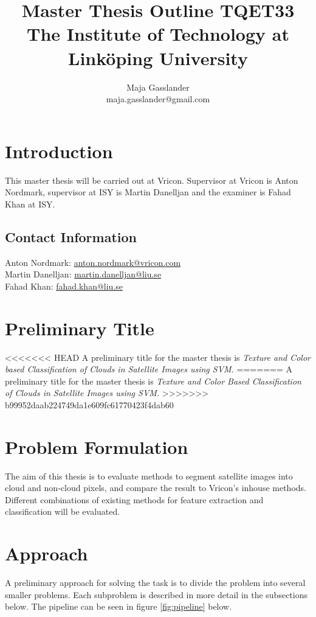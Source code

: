 \documentclass{article}
\title{Master Thesis Outline TQET33 \\
\normalsize{The Institute of Technology at Linköping University}}
\author{Maja Gasslander \\ \normalsize{maja.gasslander@gmail.com}}
\begin{document}
\maketitle
\newpage
\section{Introduction}
This master thesis will be carried out at Vricon. Supervisor at Vricon is Anton Nordmark, supervisor at ISY is Martin Danelljan and the examiner is Fahad Khan at ISY. 

\subsection{Contact Information}
Anton Nordmark: \href{mailto:anton.nordmark@vricon.com}{anton.nordmark@vricon.com}\\
Martin Danelljan: \href{mailto:martin.danelljan@liu.se}{martin.danelljan@liu.se} \\
Fahad Khan: \href{mailto:fahad.khan@liu.se}{fahad.khan@liu.se}


\section{Preliminary Title}
<<<<<<< HEAD
A preliminary title for the master thesis is \emph{Texture and Color based Classification of Clouds in Satellite Images using SVM.} 
=======
A preliminary title for the master thesis is \emph{Texture and Color Based Classification of Clouds in Satellite Images using SVM.}
>>>>>>> b99952daab224749da1e609fc61770423f4dab60

\section{Problem Formulation}
The aim of this thesis is to evaluate methods to segment satellite images into cloud and non-cloud pixels, and compare the result to Vricon's inhouse methods. Different combinations of existing methods for feature extraction and classification will be evaluated.

\section{Approach}
A preliminary approach for solving the task is to divide the problem into several smaller problems. Each subproblem is described in more detail in the subsections below. The pipeline can be seen in figure \ref{fig:pipeline} below.
\end{document}
